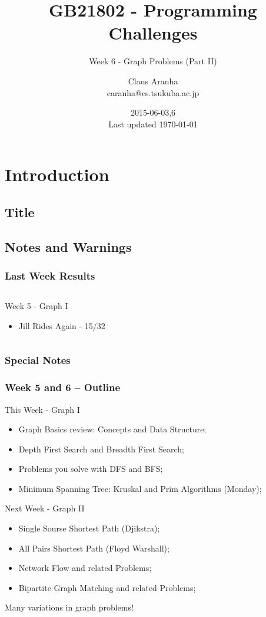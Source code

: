 \documentclass{beamer}
\title[GB21802]{GB21802 - Programming Challenges}
\subtitle[]{Week 6 - Graph Problems (Part II)}
\author[Claus Aranha]{Claus Aranha\\{\footnotesize caranha@cs.tsukuba.ac.jp}}
\institute{College of Information Science}
\date{2015-06-03,6\\{\tiny Last updated \today}}
\begin{document}
\section{Introduction}
\subsection{Title}
\begin{frame}
\maketitle
\end{frame}

\subsection{Notes and Warnings}

\begin{frame}
  \frametitle{Last Week Results}
  \begin{columns}[T]
    \begin{block}{Week 5 - Graph I}
      \begin{itemize}
      \item Jill Rides Again - 15/32
      \end{itemize}
    \end{block}
  \end{columns}
\end{frame}

\begin{frame}
  \frametitle{Special Notes}
\end{frame}

\begin{frame}
  \frametitle{Week 5 and 6 -- Outline}
  {\smaller
  \begin{block}{This Week - Graph I}
    \begin{itemize}
    \item Graph Basics review: Concepts and Data Structure;
    \item Depth First Search and Breadth First Search;
    \item Problems you solve with DFS and BFS;
    \item Minimum Spanning Tree: Kruskal and Prim Algorithms \alert{(Monday)};
     \end{itemize}
  \end{block}
  \begin{block}{Next Week - Graph II}
    \begin{itemize}
    \item Single Sourse Shortest Path (Djikstra);
    \item All Pairs Shortest Path (Floyd Warshall);   
    \item Network Flow and related Problems;
    \item Bipartite Graph Matching and related Problems;
    \end{itemize}
  \end{block}}
  Many variations in graph problems!
\end{frame}
\end{document}
